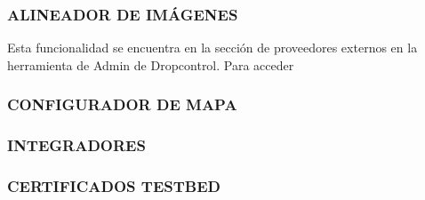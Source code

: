 \subsubsection{ALINEADOR DE IMÁGENES}

Esta funcionalidad se encuentra en la sección de proveedores externos en la herramienta de Admin de Dropcontrol. Para acceder 

\subsubsection{CONFIGURADOR DE MAPA}

\subsubsection{INTEGRADORES}

\subsubsection{CERTIFICADOS TESTBED}